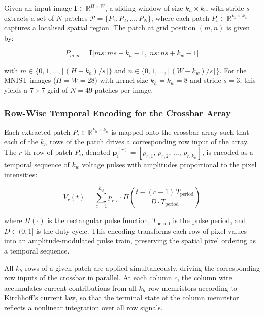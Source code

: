 \documentclass[11pt, oneside]{article}
\begin{document}
Given an input image $\mathbf{I} \in \mathbb{R}^{H \times W}$, a sliding window of size $k_h \times k_w$ with stride $s$ extracts a set of $N$ patches $\mathcal{P} = \{P_1, P_2, \ldots, P_N\}$, where each patch $P_i \in \mathbb{R}^{k_h \times k_w}$ captures a localised spatial region. The patch at grid position $(m, n)$ is given by:

\begin{equation}
    P_{m,n} = \mathbf{I}\bigl[m s : m s + k_h - 1,\; n s : n s + k_w - 1\bigr]
\end{equation}

\noindent with $m \in \{0, 1, \ldots, \lfloor(H - k_h)/s\rfloor\}$ and $n \in \{0, 1, \ldots, \lfloor(W - k_w)/s\rfloor\}$. For the MNIST images ($H = W = 28$) with kernel size $k_h = k_w = 8$ and stride $s = 3$, this yields a $7 \times 7$ grid of $N = 49$ patches per image.

\subsubsection{Row-Wise Temporal Encoding for the Crossbar Array}

Each extracted patch $P_i \in \mathbb{R}^{k_h \times k_w}$ is mapped onto the crossbar array such that each of the $k_h$ rows of the patch drives a corresponding row input of the array. The $r$-th row of patch $P_i$, denoted $\mathbf{p}_i^{(r)} = [p_{r,1},\, p_{r,2},\, \ldots,\, p_{r,k_w}]$, is encoded as a temporal sequence of $k_w$ voltage pulses with amplitudes proportional to the pixel intensities:

\begin{equation}
    V_r(t) = \sum_{c=1}^{k_w} p_{r,c} \cdot \Pi\!\left(\frac{t - (c-1)\,T_{\mathrm{period}}}{D \cdot T_{\mathrm{period}}}\right)
\end{equation}

\noindent where $\Pi(\cdot)$ is the rectangular pulse function, $T_{\mathrm{period}}$ is the pulse period, and $D \in (0, 1]$ is the duty cycle. This encoding transforms each row of pixel values into an amplitude-modulated pulse train, preserving the spatial pixel ordering as a temporal sequence.

All $k_h$ rows of a given patch are applied simultaneously, driving the corresponding row inputs of the crossbar in parallel. At each column $c$, the column wire accumulates current contributions from all $k_h$ row memristors according to Kirchhoff's current law, so that the terminal state of the column memristor reflects a nonlinear integration over all row signals.
\end{document}
